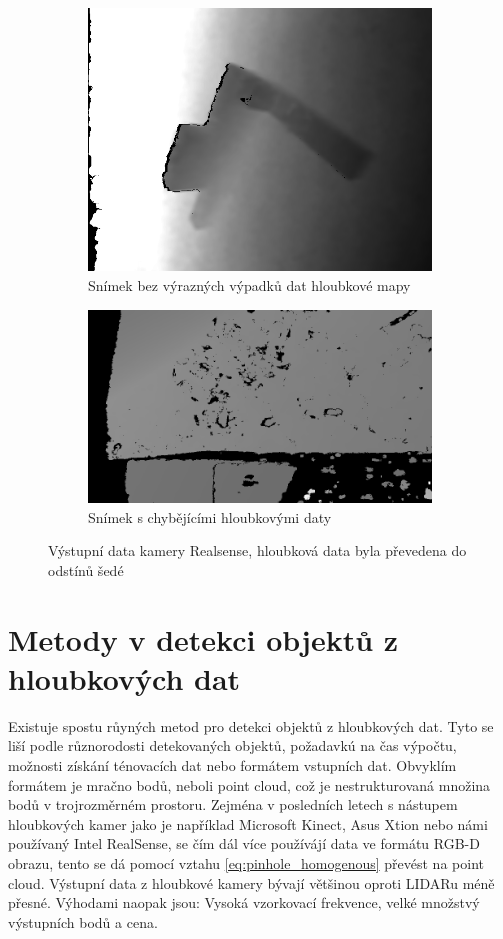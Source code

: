 \documentclass[twoside]{ctuthesis}
\begin{document}
\begin{figure}
\centering
\begin{subfigure}{0.48\textwidth}
  \centering
  \includegraphics[width=0.9\linewidth]{pictures/good_realsense.png}
  \caption{Snímek bez výrazných výpadků dat hloubkové mapy}
  \label{fig:rs_good}
\end{subfigure}
\begin{subfigure}{0.49\textwidth}
  \centering
  \includegraphics[width=0.9\linewidth]{pictures/bad_realsense.png}
  \caption{Snímek s chybějícími hloubkovými daty}
  \label{fig:rs_bad}
\end{subfigure}
\caption{Výstupní data kamery Realsense, hloubková data byla převedena do odstínů šedé}
\label{fig:realsense_pics}
\end{figure}

\section{Metody v detekci objektů z hloubkových dat}
Existuje spostu růyných metod pro detekci objektů z hloubkových dat. Tyto se liší podle různorodosti detekovaných objektů, požadavkú na čas výpočtu, možnosti získání ténovacích dat nebo formátem vstupních dat. Obvyklím formátem je mračno bodů, neboli point cloud, což je nestrukturovaná množina bodů v trojrozměrném prostoru. Zejména v posledních letech s nástupem hloubkových kamer jako je například Microsoft Kinect, Asus Xtion nebo námi používaný Intel RealSense, se čím dál více používájí data ve formátu RGB-D obrazu, tento se dá pomocí vztahu \ref{eq:pinhole_homogenous} převést na point cloud. Výstupní data z hloubkové kamery bývají většinou oproti LIDARu méně přesné. Výhodami naopak jsou: Vysoká vzorkovací frekvence, velké množstvý výstupních bodů a cena.
\end{document}

